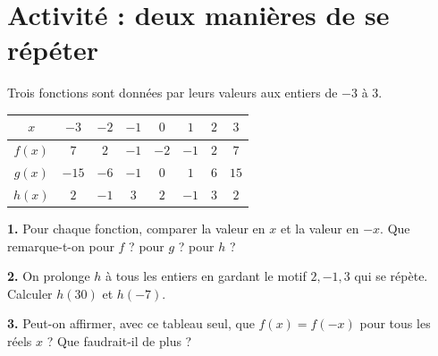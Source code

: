 \section{Activité : deux manières de se répéter}
\begin{activity}
Trois fonctions sont données par leurs valeurs aux entiers de $-3$ à $3$.
\begin{center}
\begin{tabular}{c|c|c|c|c|c|c|c}
$x$ & $-3$ & $-2$ & $-1$ & $0$ & $1$ & $2$ & $3$\\\hline
$f(x)$ & $7$ & $2$ & $-1$ & $-2$ & $-1$ & $2$ & $7$\\
$g(x)$ & $-15$ & $-6$ & $-1$ & $0$ & $1$ & $6$ & $15$\\
$h(x)$ & $2$ & $-1$ & $3$ & $2$ & $-1$ & $3$ & $2$
\end{tabular}
\end{center}
\textbf{1.} Pour chaque fonction, comparer la valeur en $x$ et la valeur en $-x$. Que remarque-t-on pour $f$ ? pour $g$ ? pour $h$ ?\par
\textbf{2.} On prolonge $h$ à tous les entiers en gardant le motif $2,-1,3$ qui se répète. Calculer $h(30)$ et $h(-7)$.\par
\textbf{3.} Peut-on affirmer, avec ce tableau seul, que $f(x)=f(-x)$ pour tous les réels $x$ ? Que faudrait-il de plus ?
\end{activity}

